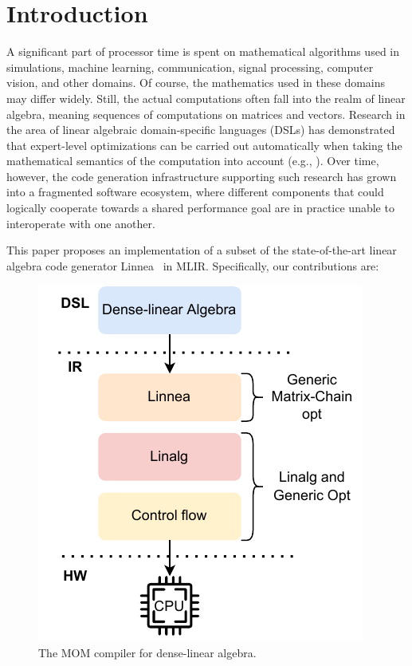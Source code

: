 \documentclass[conference]{IEEEtran}
\begin{document}
\section{Introduction}

A significant part of processor time is spent on mathematical algorithms used
in simulations, machine learning, communication, signal processing, computer
vision, and other domains. Of course, the mathematics used in these domains may
differ widely. Still, the actual computations often fall into the realm of
linear algebra, meaning sequences of computations on matrices and vectors.
Research in the area of linear algebraic domain-specific languages (DSLs) has
demonstrated that expert-level optimizations can be carried out automatically
when taking the mathematical semantics of the computation into account (e.g.,
\cite{barthels:21, spampinato:18, kjolstad:17}). Over time, however, the code
generation infrastructure supporting such research has grown into a fragmented
software ecosystem, where different components that could logically cooperate
towards a shared performance goal are in practice unable to interoperate with
one another.

This paper proposes an implementation of a subset of the state-of-the-art
linear algebra code generator Linnea~\cite{barthels:21} in MLIR. Specifically,
our contributions are:

\begin{figure}
%
\includegraphics[width=0.6\columnwidth]{images/Impact2022.drawio.pdf}
\caption{The MOM compiler for dense-linear algebra.}\label{fig:overview}
\end{figure}
\end{document}
